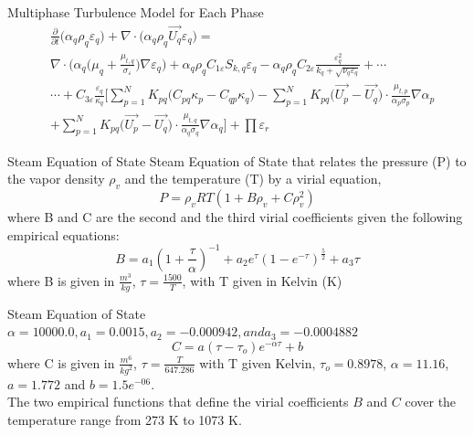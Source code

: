 \begin{frame}{Multiphase \boldmath{$\kappa-\varepsilon$} Turbulence Model for Each Phase}
    \begin{equation}\label{Repsilonmulti_eqn}
    \begin{split}
      & \frac{\partial}{\partial t} \Big(\alpha_q\rho_q\varepsilon_q\Big) + \nabla\cdot\Big(\alpha_q\rho_q \vec{U_q}\varepsilon_q\Big) = \\ 
       & \nabla\cdot\Bigg(\alpha_q\bigg(\mu_q + \frac{\mu_{t,q}}{\sigma_\varepsilon}\bigg)\nabla \varepsilon_q\Bigg) + \alpha_q\rho_q C_{1\varepsilon} S_{k,q} \varepsilon_q - \alpha_q\rho_q C_{2\varepsilon} \frac{\varepsilon_q^2}{k_q + \sqrt{\nu_q \varepsilon_q}}+\dotsm \\
       &\dotsm + C_{3\varepsilon}\frac{\varepsilon_q}{\kappa_q}\bigg[\sum_{p=1}^{N} K_{pq}\Big(C_{pq}\kappa_p - C_{qp}\kappa_q\Big) - \sum_{p=1}^{N} K_{pq} \Big(\vec{U_p}-\vec{U_q}\Big)\cdot\frac{\mu_{t,p}}{\alpha_p \sigma_p}\nabla \alpha_p \\
      & + \sum_{p=1}^{N} K_{pq} \Big(\vec{U_p}-\vec{U_q}\Big)\cdot\frac{\mu_{t,q}}{\alpha_q \sigma_q}\nabla \alpha_q\bigg] + \prod \varepsilon_r
    \end{split}
\end{equation}
\end{frame}

\begin{frame}{Steam Equation of State\cite{ansys2011ansys}}
Steam Equation of State that relates the pressure (P) to the vapor density $\rho_{v}$ and the temperature (T) by a virial equation\cite{young1988equation},
    \begin{equation}
        P = \rho_{v}RT (1 + B\rho_{v} + C\rho_{v}^{2})
    \end{equation}
where B and C are the second and the third virial coefficients given the following empirical equations:
    \begin{equation}
        B = a_{1}(1 + \frac{\tau}{\alpha})^{-1} + a_{2}e^{\tau}(1 - e^{-\tau})^{\frac{5}{2}} + a_{3}\tau
    \end{equation}
where B is given in $\frac{m^{3}}{kg}$, $\tau=\frac{1500}{T}$, with T given in Kelvin (K)
\end{frame}

\begin{frame}{Steam Equation of State\cite{ansys2011ansys}}
        $\alpha = 10000.0, a_{1} = 0.0015, a_{2} = -0.000942, and a_{3} = -0.0004882$
    \begin{equation}
        C = a (\tau - \tau_{o})e^{-\alpha \tau} + b
    \end{equation}
where C is given in $\frac{m^{6}}{kg^{2}}$, $\tau = \frac{T}{647.286}$ with T given Kelvin, $\tau_{o}=0.8978$, $\alpha=11.16$, $a=1.772$ and $b=1.5e^{-06}$.\\
The two empirical functions that define the virial coefficients $B$ and $C$ cover the temperature range from 273 K to 1073 K.
\end{frame}

